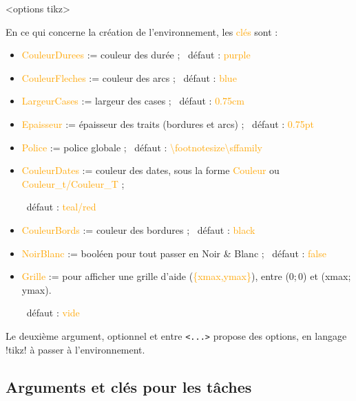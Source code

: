 \documentclass[french,a4paper,11pt]{article}
\newcommand\Cle[1]{{\small\sffamily\textlangle \textcolor{orange}{#1}\textrangle}}
\begin{document}
{{\begin{DemoCode}
\begin{GrapheMPM}[clés]<options tikz>
\end{GrapheMPM}
\end{DemoCode}

\begin{tipblock}
En ce qui concerne la création de l'environnement, les \Cle{clés} sont :

\begin{itemize}
	\item \Cle{CouleurDurees} := couleur des durée ; \hfill~défaut : \Cle{purple}
	\item \Cle{CouleurFleches} := couleur des arcs ; \hfill~défaut : \Cle{blue}
	\item \Cle{LargeurCases} := largeur des cases ; \hfill~défaut : \Cle{0.75cm}
	\item \Cle{Epaisseur} := épaisseur des traits (bordures et arcs) ; \hfill~défaut : \Cle{0.75pt}
	\item \Cle{Police} := police globale ; \hfill~défaut : \Cle{\textbackslash footnotesize\textbackslash sffamily}
	\item \Cle{CouleurDates} := couleur des dates, sous la forme \Cle{Couleur} ou \Cle{Couleur\_t/Couleur\_T} ;
	
	\hfill~défaut : \Cle{teal/red}
	\item \Cle{CouleurBords} := couleur des bordures ; \hfill~défaut : \Cle{black}
	\item \Cle{NoirBlanc} := booléen pour tout passer en Noir \&{} Blanc ; \hfill~défaut : \Cle{false}
	\item \Cle{Grille} := pour afficher une grille d'aide (\Cle{\{xmax,ymax\}}), entre (0;\,0) et (xmax;\,ymax).
	
	\hfill~défaut : \Cle{vide}
\end{itemize}

Le deuxième argument, optionnel et entre \texttt{<...>} propose des options, en langage \packagetex!tikz! à passer à l'environnement.
\end{tipblock}

\begin{DemoCode}[]
\begin{GrapheMPM}[Grille={14,5}]
\end{GrapheMPM}
\end{DemoCode}

\pagebreak

\subsection{Arguments et clés pour les tâches}

}}
\end{document}
